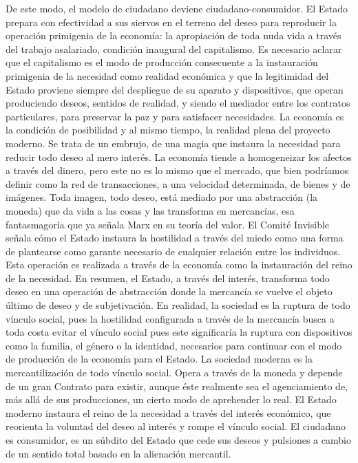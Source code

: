 \documentclass[
]{article}
\begin{document}
De este modo, el modelo de ciudadano deviene ciudadano-consumidor. El
Estado prepara con efectividad a sus siervos en el terreno del deseo
para reproducir la operación primigenia de la economía: la apropiación
de toda nuda vida a través del trabajo asalariado, condición inaugural
del capitalismo. Es necesario aclarar que el capitalismo es el modo de
producción consecuente a la instauración primigenia de la necesidad como
realidad económica y que la legitimidad del Estado proviene siempre del
despliegue de su aparato y dispositivos, que operan produciendo deseos,
sentidos de realidad, y siendo el mediador entre los contratos
particulares, para preservar la paz y para satisfacer necesidades. La
economía es la condición de posibilidad y al mismo tiempo, la realidad
plena del proyecto moderno. Se trata de un embrujo, de una magia que
instaura la necesidad para reducir todo deseo al mero interés. La
economía tiende a homogeneizar los afectos a través del dinero, pero
este no es lo mismo que el mercado, que bien podríamos definir como la
red de transacciones, a una velocidad determinada, de bienes y de
imágenes. Toda imagen, todo deseo, está mediado por una abstracción (la
moneda) que da vida a las cosas y las transforma en mercancías, esa
fantasmagoría que ya señala Marx en su teoría del valor. El Comité
Invisible señala cómo el Estado instaura la hostilidad a través del
miedo como una forma de plantearse como garante necesario de cualquier
relación entre los individuos. Esta operación es realizada a través de
la economía como la instauración del reino de la necesidad. En resumen,
el Estado, a través del interés, transforma todo deseo en una operación
de abstracción donde la mercancía se vuelve el objeto último de deseo y
de subjetivación. En realidad, la sociedad es la ruptura de todo vínculo
social, pues la hostilidad configurada a través de la mercancía busca a
toda costa evitar el vínculo social pues este significaría la ruptura
con dispositivos como la familia, el género o la identidad, necesarios
para continuar con el modo de producción de la economía para el Estado.
La sociedad moderna es la mercantilización de todo vínculo social. Opera
a través de la moneda y depende de un gran Contrato para existir, aunque
éste realmente sea el agenciamiento de, más allá de sus producciones, un
cierto modo de aprehender lo real. El Estado moderno instaura el reino
de la necesidad a través del interés económico, que reorienta la
voluntad del deseo al interés y rompe el vínculo social. El ciudadano es
consumidor, es un súbdito del Estado que cede sus deseos y pulsiones a
cambio de un sentido total basado en la alienación mercantil.
\end{document}
